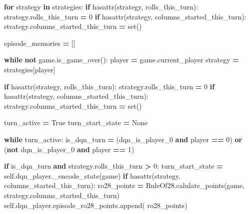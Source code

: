 \documentclass[12pt]{article}
\newenvironment{Shaded}{\begin{snugshade}}{\end{snugshade}}
\newcommand{\BuiltInTok}[1]{#1}
\newcommand{\ControlFlowTok}[1]{\textcolor[rgb]{0.13,0.29,0.53}{\textbf{#1}}}
\newcommand{\DecValTok}[1]{\textcolor[rgb]{0.00,0.00,0.81}{#1}}
\newcommand{\KeywordTok}[1]{\textcolor[rgb]{0.13,0.29,0.53}{\textbf{#1}}}
\newcommand{\NormalTok}[1]{#1}
\newcommand{\OperatorTok}[1]{\textcolor[rgb]{0.81,0.36,0.00}{\textbf{#1}}}
\newcommand{\StringTok}[1]{\textcolor[rgb]{0.31,0.60,0.02}{#1}}
\newcommand{\VariableTok}[1]{\textcolor[rgb]{0.00,0.00,0.00}{#1}}
\begin{document}
\begin{thesis}
\begin{Shaded}
\begin{Highlighting}[]
        \ControlFlowTok{for}\NormalTok{ strategy }\KeywordTok{in}\NormalTok{ strategies:}
            \ControlFlowTok{if} \BuiltInTok{hasattr}\NormalTok{(strategy, }\StringTok{\textquotesingle{}rolls\_this\_turn\textquotesingle{}}\NormalTok{):}
\NormalTok{                strategy.rolls\_this\_turn }\OperatorTok{=} \DecValTok{0}
            \ControlFlowTok{if} \BuiltInTok{hasattr}\NormalTok{(strategy, }\StringTok{\textquotesingle{}columns\_started\_this\_turn\textquotesingle{}}\NormalTok{):}
\NormalTok{                strategy.columns\_started\_this\_turn }\OperatorTok{=} \BuiltInTok{set}\NormalTok{()}
        
\NormalTok{        episode\_memories }\OperatorTok{=}\NormalTok{ []}
        
        \ControlFlowTok{while} \KeywordTok{not}\NormalTok{ game.is\_game\_over():}
\NormalTok{            player }\OperatorTok{=}\NormalTok{ game.current\_player}
\NormalTok{            strategy }\OperatorTok{=}\NormalTok{ strategies[player]}
            
            \ControlFlowTok{if} \BuiltInTok{hasattr}\NormalTok{(strategy, }\StringTok{\textquotesingle{}rolls\_this\_turn\textquotesingle{}}\NormalTok{):}
\NormalTok{                strategy.rolls\_this\_turn }\OperatorTok{=} \DecValTok{0}
            \ControlFlowTok{if} \BuiltInTok{hasattr}\NormalTok{(strategy, }\StringTok{\textquotesingle{}columns\_started\_this\_turn\textquotesingle{}}\NormalTok{):}
\NormalTok{                strategy.columns\_started\_this\_turn }\OperatorTok{=} \BuiltInTok{set}\NormalTok{()}
            
\NormalTok{            turn\_active }\OperatorTok{=} \VariableTok{True}
\NormalTok{            turn\_start\_state }\OperatorTok{=} \VariableTok{None}
            
            \ControlFlowTok{while}\NormalTok{ turn\_active:}
\NormalTok{                is\_dqn\_turn }\OperatorTok{=}\NormalTok{ (dqn\_is\_player\_0 }\KeywordTok{and}\NormalTok{ player }\OperatorTok{==} \DecValTok{0}\NormalTok{) }\KeywordTok{or} 
\NormalTok{                                    (}\KeywordTok{not}\NormalTok{ dqn\_is\_player\_0 }\KeywordTok{and}\NormalTok{ player }\OperatorTok{==} \DecValTok{1}\NormalTok{)}
                
                \ControlFlowTok{if}\NormalTok{ is\_dqn\_turn }\KeywordTok{and}\NormalTok{ strategy.rolls\_this\_turn }\OperatorTok{\textgreater{}} \DecValTok{0}\NormalTok{:}
\NormalTok{                    turn\_start\_state }\OperatorTok{=} \VariableTok{self}\NormalTok{.dqn\_player.\_encode\_state(game)}
                    \ControlFlowTok{if} \BuiltInTok{hasattr}\NormalTok{(strategy, }\StringTok{\textquotesingle{}columns\_started\_this\_turn\textquotesingle{}}\NormalTok{):}
\NormalTok{                        ro28\_points }\OperatorTok{=}\NormalTok{ RuleOf28.calulate\_points(game,}
\NormalTok{                                  strategy.columns\_started\_this\_turn)}
                        \VariableTok{self}\NormalTok{.dqn\_player.episode\_ro28\_points.append(}
\NormalTok{                                                        ro28\_points)}


\end{Highlighting}
\end{Shaded}
\end{thesis}
\end{document}
